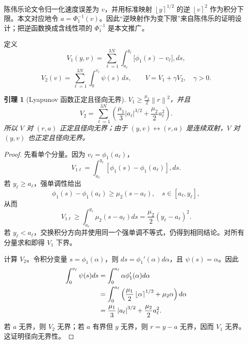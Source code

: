 \documentclass[UTF8,a4paper,12pt]{ctexart}
\newtheorem{lemma}{引理}
\newcommand{\norm}[1]{\left\lVert #1\right\rVert}
\newcommand{\abs}[1]{\left\lvert #1\right\rvert}
\newcommand{\ipow}[2]{\left\lfloor #1\right\rceil^{#2}}
\begin{document}
\begin{chenbox}
陈伟乐论文令归一化速度误差为 $v$，并用标准映射 $\ipow{y}{1/2}$ 的逆 $\ipow{v}{2}$ 作为积分下限。本文对应地令 $a=\Phi_1^{-1}(v)$。因此“逆映射作为变下限”来自陈伟乐的证明设计；把逆函数换成含线性项的 $\Phi_1^{-1}$ 是本文推广。
\end{chenbox}

定义
\begin{equation}
 V_1(y,v)
 =\sum_{\ell=1}^{3N}\int_{a_\ell}^{y_\ell}
 \big[\phi_1(s)-v_\ell\big],ds,
\label{eq:V1}
\end{equation}
\begin{equation}
 V_2(v)=\sum_{\ell=1}^{3N}\int_0^{v_\ell}\psi(s)\,ds,
 \qquad V=V_1+\gamma V_2,\quad\gamma>0.
\label{eq:V-total}
\end{equation}

\begin{lemma}[Lyapunov 函数正定且径向无界]
$V_1\ge\frac{\mu_2}{2}\norm r^2$，并且
\begin{equation}
 V_2=\sum_{\ell=1}^{3N}
 \left(\frac{\mu_1}{3}\abs{a_\ell}^{3/2}
 +\frac{\mu_2}{2}a_\ell^2\right).
\label{eq:V2-explicit}
\end{equation}
所以 $V$ 对 $(r,a)$ 正定且径向无界；由于 $(y,v)\leftrightarrow(r,a)$ 是连续双射，$V$ 对 $(y,v)$ 也正定且径向无界。
\end{lemma}

\begin{proof}
先看单个分量。因为 $v_\ell=\phi_1(a_\ell)$，
\begin{equation}
 V_{1\ell}=\int_{a_\ell}^{y_\ell}
 [\phi_1(s)-\phi_1(a_\ell)],ds.
\end{equation}
若 $y_\ell\ge a_\ell$，强单调性给出
\begin{equation}
 \phi_1(s)-\phi_1(a_\ell)\ge\mu_2(s-a_\ell),
 \quad s\in[a_\ell,y_\ell],
\end{equation}
从而
\begin{equation}
 V_{1\ell}\ge\int_{a_\ell}^{y_\ell}\mu_2(s-a_\ell)ds
 =\frac{\mu_2}{2}(y_\ell-a_\ell)^2.
\end{equation}
若 $y_\ell<a_\ell$，交换积分方向并使用同一个强单调不等式，仍得到相同结论。对所有分量求和即得 $V_1$ 下界。

计算 $V_2$。令积分变量 $s=\phi_1(\alpha)$，则 $ds=\phi_1'(\alpha)d\alpha$，且 $\psi(s)=\alpha$。因此
\begin{align}
 \int_0^{v_\ell}\psi(s)ds
 &=\int_0^{a_\ell}\alpha\phi_1'(\alpha)d\alpha\notag\\
 &=\int_0^{a_\ell}
 \left(\frac{\mu_1}{2}\ipow{\alpha}{1/2}+\mu_2\alpha\right)d\alpha\notag\\
 &=\frac{\mu_1}{3}\abs{a_\ell}^{3/2}+\frac{\mu_2}{2}a_\ell^2.
\end{align}
若 $a$ 无界，则 $V_2$ 无界；若 $a$ 有界但 $y$ 无界，则 $r=y-a$ 无界，因而 $V_1$ 无界。这证明径向无界性。
\end{proof}
\end{document}
